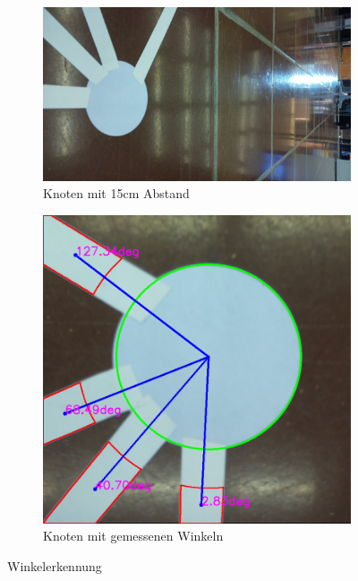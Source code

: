 \begin{figure}[H]
\begin{subfigure}{0.55\textwidth}
\includegraphics[width=0.95\linewidth]{assets/informatik-prototyp/opencv/knoten-bild.jpeg} 
\caption{Knoten mit 15cm Abstand}
\label{fig:node-15cm-before}
\end{subfigure}
\begin{subfigure}{0.4\textwidth}
\includegraphics[width=0.95\linewidth]{assets/informatik-prototyp/opencv/angle_detection/node_with_edge_angles_annotated.png} 
\caption{Knoten mit gemessenen Winkeln}
\label{fig:node-angles}
\end{subfigure}

\caption{Winkelerkennung}
\label{fig:angle-recognition}
\end{figure}

